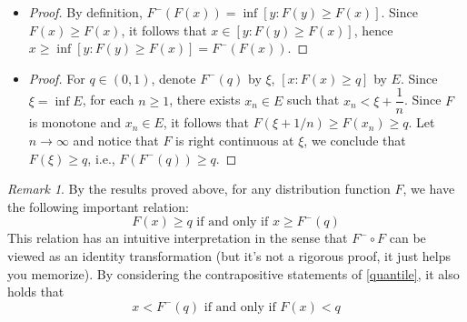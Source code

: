 \documentclass{article}
\theoremstyle{definition}
\theoremstyle{plain}
\theoremstyle{remark}
\newtheorem*{rem}{Remark}
\begin{document}
\begin{description}
\begin{itemize}
\begin{proof}
Fix $q \in (0, 1)$, and let $\{q_n\}$ be a sequence such that $q_n \uparrow q$. By the monotonicity of $F^-$ just 
proved, the sequence $\{F^-(q_n)\}$ is increasing and bounded above by $F^-(q)$, hence $\{F^-(q_n)\}$ must
converge to some limit $a \leq F^-(q)$, by monotone bounded convergence theorem (Theorem $3.14$ in \cite{rudin1964}). If $a < F^-(q)$, then $F(a) < q$, otherwise $F(a) \geq q$ would imply that $F^-(q) \leq a$, which 
would be in contradiction to $a < F^-(q)$. On the other hand, since $F^-(q_n) \leq a$, by monotonicity of $F$, we 
have $F(F^-(q_n)) \leq F(a)$. By the property which will be shown in the third item, this implies that $q_n \leq F(a)$ for all $n$, thereby $\limsup_n q_n \leq F(a) < q$, which is in contradiction to $q_n \uparrow q$. Hence $a = F^-(q)$, i.e., $\lim_{q_n \uparrow q} F^-(q_n) = F^-(q)$, that is, $F^-$ is left continuous at $q$.
\end{proof}

\item 
\begin{proof}
By definition, $F^-(F(x)) = \inf[y: F(y) \geq F(x)]$. Since $F(x) \geq F(x)$, it follows that $x \in [y: F(y) \geq F(x)]$, 
hence $x \geq \inf[y: F(y) \geq F(x)] = F^-(F(x))$.
\end{proof}

\item
\begin{proof}
For $q \in (0, 1)$, denote $F^-(q)$ by $\xi$, $[x: F(x) \geq q]$ by $E$. Since $\xi = \inf E$, for each $n \geq 1$, there exists $x_n \in E$ such that $x_n < \xi + \dfrac{1}{n}$. Since $F$ is monotone and $x_n \in E$, it follows that
$F(\xi + 1/n) \geq F(x_n) \geq q$. Let $n \to \infty$ and notice that $F$ is right continuous at $\xi$, we conclude 
that $F(\xi) \geq q$, i.e., $F(F^-(q)) \geq q$. 
\end{proof}
\end{itemize}

\begin{rem}
By the results proved above, for any distribution function $F$, we have the following important relation:
\begin{equation}\label{quantile}
\boxed{F(x) \geq q  \text{ if and only if } x \geq F^-(q)}
\end{equation}
This relation has an intuitive interpretation in the sense that $F^- \circ F$ can 
be viewed as an identity transformation (but it's not a rigorous proof, it just 
helps you memorize). By considering the contrapositive statements of 
\eqref{quantile}, it also holds that
\begin{equation}\label{cpquantile}
\boxed{x < F^{-}(q) \text{ if and only if } F(x) < q}
\end{equation}


\end{rem}
\end{description}
\end{document}
